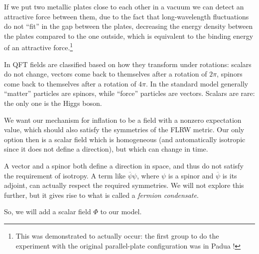 \documentclass[main.tex]{subfiles}
\begin{document}
If we put two metallic plates close to each other in a vacuum we can detect an attractive force between them, due to the fact that long-wavelength fluctuations do not ``fit'' in the gap between the plates, decreasing the energy density between the plates compared to the one outside, which is equivalent to the binding energy of an attractive force.\footnote{This was demonstrated to actually occur: the first group to do the experiment with the original parallel-plate configuration was in Padua \cite[]{bressiMeasurementCasimirForce2002}!}


In QFT fields are classified based on how they transform under rotations: scalars do not change, vectors come back to themselves after a rotation of \(2 \pi \), spinors come back to themselves after a rotation of \(4 \pi \). 
In the standard model generally ``matter'' particles are spinors, while ``force'' particles are vectors. Scalars are rare: the only one is the Higgs boson.

We want our mechanism for inflation to be a field with a nonzero expectation value, which should also satisfy the symmetries of the FLRW  metric.
Our only option then is a scalar field which is homogeneous (and automatically isotropic since it does not define a direction), but which can change in time. 

A vector and a spinor both define a direction in space, and thus do not satisfy the requirement of isotropy. 
A term like \(\overline{\psi} \psi \), where \(\psi \) is a spinor and \(\overline{\psi}\) is its adjoint, can actually respect the required symmetries. We will not explore this further, but it gives rise to what is called a \emph{fermion condensate}. 

So, we will add a scalar field \(\Phi \) to our model. 




\end{document}
